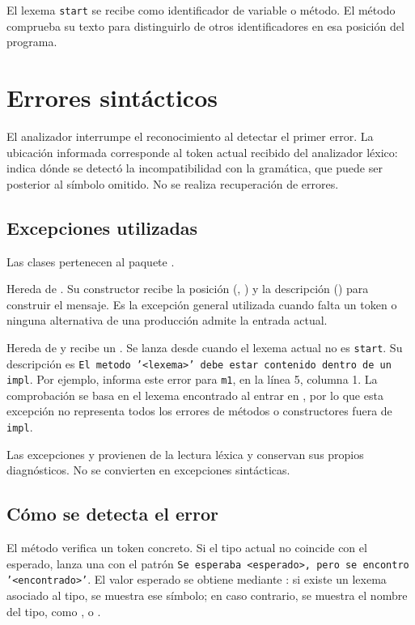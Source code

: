 El lexema \texttt{start} se recibe como identificador de variable o método.
El método  comprueba su texto para distinguirlo de
otros identificadores en esa posición del programa.

\section{Errores sintácticos}
\label{sec:errores-sintacticos}
\begingroup
\setlength{\emergencystretch}{3em}
El analizador interrumpe el reconocimiento al detectar el primer error.
La ubicación informada corresponde al token actual recibido del analizador
léxico: indica dónde se detectó la incompatibilidad con la gramática, que
puede ser posterior al símbolo omitido. No se realiza recuperación de errores.

\subsection{Excepciones utilizadas}
Las clases pertenecen al paquete
.
\begin{description}[style=nextline]
  \item[\lexcode{SyntacticException}]
  Hereda de . Su constructor recibe la posición
  (, ) y la descripción
  () para construir el mensaje.
  Es la excepción general utilizada cuando falta un token o
  ninguna alternativa de una producción admite la entrada actual.

  \item[\lexcode{MethodOutsideImplException}]
  Hereda de  y recibe un .
  Se lanza desde  cuando el lexema actual no es
  \texttt{start}. Su descripción es
  \texttt{El metodo '<lexema>' debe estar contenido dentro de un impl}.
  Por ejemplo,  informa este error para
  \texttt{m1}, en la línea 5, columna 1. La comprobación se basa en
  el lexema encontrado al entrar en , por lo que esta
  excepción no representa todos los errores de métodos o constructores
  fuera de \texttt{impl}.
\end{description}

Las excepciones  y
 provienen de la lectura léxica y conservan
sus propios diagnósticos. No se convierten en excepciones sintácticas.

\subsection{Cómo se detecta el error}
El método  verifica un token concreto. Si el
tipo actual no coincide con el esperado, lanza una
 con el patrón
\texttt{Se esperaba <esperado>, pero se encontro '<encontrado>'}.
El valor esperado se obtiene mediante :
si existe un lexema asociado al tipo, se muestra ese símbolo; en caso
contrario, se muestra el nombre del tipo, como
,  o .

